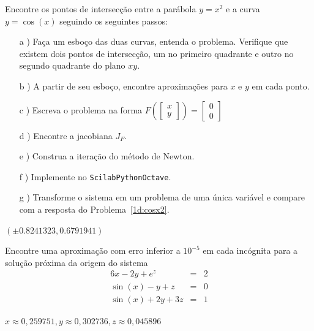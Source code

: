 \begin{exer} Encontre os pontos de intersecção entre a parábola $y=x^2$ e a curva $y=\cos(x)$ seguindo os seguintes passos:
\begin{itemize}
\item[a]) Faça um esboço das duas curvas, entenda o problema. Verifique que existem dois pontos de intersecção, um no primeiro quadrante e outro no segundo quadrante do plano $xy$.
\item[b]) A partir de seu esboço, encontre aproximações para $x$ e $y$ em cada ponto.
\item[c]) Escreva o problema na forma $F\left(\left[\begin{array}{c}x\\y\end{array}\right]\right)=\left[\begin{array}{c}0\\0\end{array}\right]$
\item[d]) Encontre a jacobiana $J_F$.
\item[e]) Construa a iteração do método de Newton.
\item[f]) Implemente no \ifisscilab\verb+Scilab+\fi\ifispython\verb+Python+\fi\ifisoctave\verb+Octave+\fi.
\item[g]) Transforme o sistema em um problema de uma única variável e compare com a resposta do Problema~\ref{1d:cosx2}.
\end{itemize}
\end{exer}
\begin{resp}
 $\left(\pm 0.8241323, 0.6791941\right)$
\end{resp}

\begin{exer} Encontre uma aproximação com erro inferior a $10^{-5}$ em cada incógnita para a solução próxima da origem do sistema
\begin{eqnarray*}
6x-2y+e^{z}&=&2\\
\sin(x)-y+z&=&0\\
\sin(x)+2y+3z&=&1
\end{eqnarray*}
\end{exer}
\begin{resp}
$x\approx 0,259751, y\approx  0,302736, z\approx  0,045896$
\end{resp}


